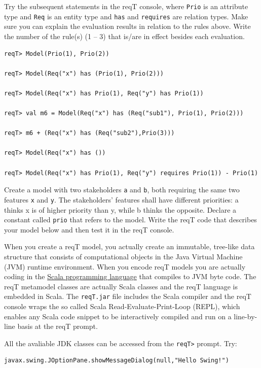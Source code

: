 \documentclass[11pt]{article}
\begin{document}
\begin{framed}\noindent
Try the subsequent statements in the reqT console, where \verb+Prio+ is an attribute type and \verb+Req+ is an entity type and \verb+has+ and \verb+requires+ are relation types. Make sure you can explain the evaluation results in relation to the rules above. Write the number of the rule(s) (1 -- 3) that is/are in effect besides each evaluation. 

{\scriptsize \begin{verbatim}
reqT> Model(Prio(1), Prio(2))

reqT> Model(Req("x") has (Prio(1), Prio(2)))

reqT> Model(Req("x") has Prio(1), Req("y") has Prio(1))

reqT> val m6 = Model(Req("x") has (Req("sub1"), Prio(1), Prio(2))) 

reqT> m6 + (Req("x") has (Req("sub2"),Prio(3)))

reqT> Model(Req("x") has ())

reqT> Model(Req("x") has Prio(1), Req("y") requires Prio(1)) - Prio(1)
\end{verbatim}}
\end{framed}

\begin{framed}\noindent
Create a model with two stakeholders \verb+a+ and \verb+b+, both requiring the same two features \verb+x+ and \verb+y+. The stakeholders' features shall have different priorities: a thinks x is of higher priority than y, while b thinks the opposite. Declare a constant called \verb+prio+ that refers to the model. Write the reqT code that describes your model below and then test it in the reqT console.
\newline
\newline 
\vspace{3cm}

\end{framed}

When you create a reqT model, you actually create an immutable, tree-like data structure that consists of computational objects in the Java Virtual Machine (JVM) runtime environment. When you encode reqT models you are actually coding in the \href{http://en.wikipedia.org/wiki/Scala_\%28programming_language\%29} {Scala programming language} that compiles to JVM byte code. The reqT metamodel classes are actually Scala classes and the reqT language is embedded in Scala. The \verb+reqT.jar+ file includes the Scala compiler and the reqT console wraps the so called Scala Read-Evaluate-Print-Loop (REPL), which enables any Scala code snippet to be interactively compiled and run on a line-by-line basis at the reqT prompt. 
\begin{framed}\noindent All the avaliable JDK classes can be accessed from the \verb+reqT>+ prompt. Try:
{\footnotesize\begin{verbatim}
javax.swing.JOptionPane.showMessageDialog(null,"Hello Swing!")
\end{verbatim}}
\end{framed}
\end{document}
